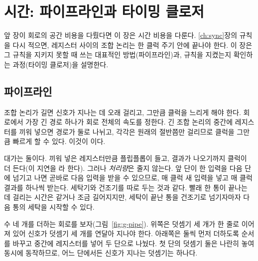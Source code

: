 \chapter{시간: 파이프라인과 타이밍 클로저}\label{ch:pipeline}

앞 장이 회로의 공간 비용을 다뤘다면 이 장은 시간 비용을 다룬다. \ref{ch:sync}장의 규칙을 다시 적으면,
레지스터 사이의 조합 논리는 한 클럭 주기 안에 끝나야 한다. 이 장은 그 규칙을 지키지 못할 때 쓰는 대표적인
방법(파이프라인)과, 규칙을 지켰는지 확인하는 과정(타이밍 클로저)을 설명한다.

\section{파이프라인}\label{sec:pipeline}

\Why 조합 논리가 길면 신호가 지나는 데 오래 걸리고, 그만큼 클럭을 느리게 해야 한다. 회로에서 가장 긴
경로 하나가 회로 전체의 속도를 정한다. 긴 조합 논리의 중간에 레지스터를 끼워 넣으면 경로가 둘로 나뉘고,
각각은 원래의 절반쯤만 걸리므로 클럭을 그만큼 빠르게 할 수 있다. 이것이 이다.

대가는 둘이다. 끼워 넣은 레지스터만큼 플립플롭이 들고, 결과가 나오기까지 클럭이 더 든다(이 지연을
라 한다). 그러나 \emph{처리량}은 줄지 않는다. 앞 단이 한 입력을 다음 단에 넘기고
나면 곧바로 다음 입력을 받을 수 있으므로, 매 클럭 새 입력을 넣고 매 클럭 결과를 하나씩 받는다.
세탁기와 건조기를 따로 두는 것과 같다. 빨래 한 통이 끝나는 데 걸리는 시간은 같거나 조금 길어지지만,
세탁이 끝난 통을 건조기로 넘기자마자 다음 통의 세탁을 시작할 수 있다.

\General 수 네 개를 더하는 회로를 보자(그림~\ref{fig:g-pipe}). 위쪽은 덧셈기 세 개가 한 줄로 이어져 있어
신호가 덧셈기 세 개를 연달아 지나야 한다. 아래쪽은 둘씩 먼저 더하도록 순서를 바꾸고 중간에 레지스터를 넣어
두 단으로 나눴다. 첫 단의 덧셈기 둘은 나란히 놓여 동시에 동작하므로, 어느 단에서든 신호가 지나는 덧셈기는
하나다.

